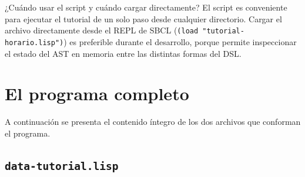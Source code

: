 \documentclass[12pt,a4paper]{report}
\begin{document}
\begin{infobox}{¿Cuándo usar el script y cuándo cargar directamente?}
El script es conveniente para ejecutar el tutorial de un solo paso desde
cualquier directorio.  Cargar el archivo directamente desde el REPL de
SBCL (\texttt{(load "tutorial-horario.lisp")}) es preferible durante el
desarrollo, porque permite inspeccionar el estado del AST en memoria entre
las distintas formas del DSL.
\end{infobox}

\section{El programa completo}
\label{sec:completo}

A continuación se presenta el contenido íntegro de los dos archivos que
conforman el programa.

\subsection{\texttt{data-tutorial.lisp}}
\end{document}
